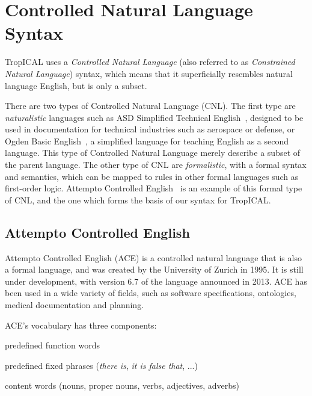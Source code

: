 \section{Controlled Natural Language Syntax}
\label{sec:t-constrained}

TropICAL uses a \emph{Controlled Natural Language} (also referred to as
\emph{Constrained Natural Language}) syntax, which means that it superficially
resembles natural language English, but is only a subset.

There are two types of Controlled Natural Language (CNL). The first type are \emph{naturalistic} languages
such as ASD Simplified Technical English~\cite{asd2007simplified}, designed to
be used in documentation for technical industries such as aerospace or defense,
or Ogden Basic English~\cite{ogden1944basic}, a simplified language for teaching
English as a second language. This type of Controlled Natural Language merely
describe a subset of the parent language. The other type of CNL are
\emph{formalistic}, with a formal
syntax and semantics, which can be mapped to rules in other formal languages
such as first-order logic. Attempto Controlled English~\cite{fuchs1996attempto}
is an example of this formal type of CNL, and the one which forms the basis of
our syntax for TropICAL.

\subsection{Attempto Controlled English}

Attempto Controlled English (ACE) is a controlled natural language that is also
a formal language, and was created by the University of Zurich in 1995. It is
still under development, with version 6.7 of the language announced in 2013. ACE
has been used in a wide variety of fields, such as software specifications,
ontologies, medical documentation and planning.

ACE's vocabulary has three components:

\begin{compactitem}
  \item predefined function words
  \item predefined fixed phrases (\emph{there is}, \emph{it is false that}, ...)
  \item content words (nouns, proper nouns, verbs, adjectives, adverbs)
\end{compactitem}

